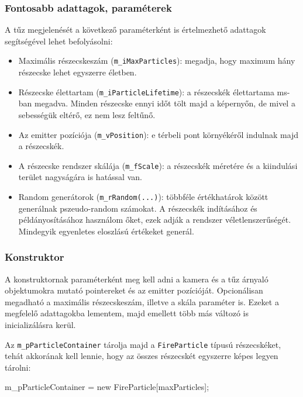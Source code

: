 \subsubsection{Fontosabb adattagok, paraméterek}
A tűz megjelenését a következő paraméterként is értelmezhető adattagok segítségével lehet befolyásolni:
\begin{itemize}
\item Maximális részecskeszám (\texttt{m\_iMaxParticles}): megadja, hogy maximum hány részecske lehet egyszerre életben.
\item Részecske élettartam (\texttt{m\_iParticleLifetime}): a részecskék élettartama ms-ban megadva. Minden részecske ennyi időt tölt majd a képernyőn, de mivel a sebességük eltérő, ez nem lesz feltűnő.
\item Az emitter pozíciója (\texttt{m\_vPosition}): e térbeli pont környékéről indulnak majd a részecskék.
\item A részecske rendszer skálája (\texttt{m\_fScale}): a részecskék méretére és a kiindulási terület nagyságára is hatással van.
\item Random generátorok (\texttt{m\_rRandom(...)}): többféle értékhatárok között generálnak pszeudo-random számokat. A részecskék indításához és példányosításához használom őket, ezek adják a rendszer véletlenszerűségét. Mindegyik egyenletes eloszlású értékeket generál.
\end{itemize}

\subsubsection{Konstruktor}
A konstruktornak paraméterként meg kell adni a kamera és a tűz árnyaló objektumokra mutató pointereket és az emitter pozícióját. Opcionálisan megadható a maximális részecskeszám, illetve a skála paraméter is. Ezeket a megfelelő adattagokba lementem, majd emellett több más változó is inicializálásra kerül. 

Az \texttt{m\_pParticleContainer} tárolja majd a \texttt{FireParticle} típusú részecskéket, tehát akkorának kell lennie, hogy az összes részecskét egyszerre képes legyen tárolni:
\begin{cpp}
m_pParticleContainer = new FireParticle[maxParticles];
\end{cpp}

